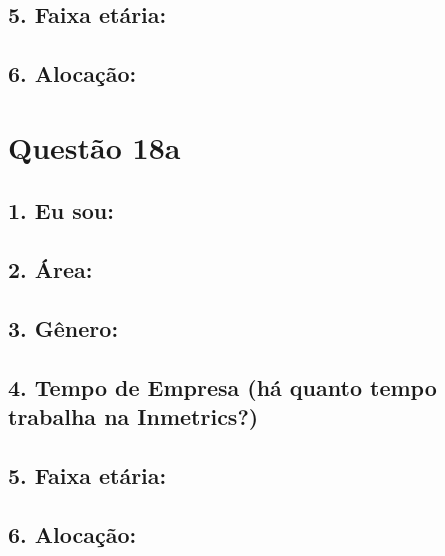 \documentclass[]{book}
\begin{document}
\hypertarget{faixa-etaria-39}{%
\subsection{5. Faixa etária:}\label{faixa-etaria-39}}

\hypertarget{alocacao-39}{%
\subsection{6. Alocação:}\label{alocacao-39}}

\hypertarget{questao-18a}{%
\section{Questão 18a}\label{questao-18a}}

\hypertarget{eu-sou-40}{%
\subsection{1. Eu sou:}\label{eu-sou-40}}

\hypertarget{area-40}{%
\subsection{2. Área:}\label{area-40}}

\hypertarget{genero-40}{%
\subsection{3. Gênero:}\label{genero-40}}

\hypertarget{tempo-de-empresa-ha-quanto-tempo-trabalha-na-inmetrics-40}{%
\subsection{4. Tempo de Empresa (há quanto tempo trabalha na Inmetrics?)}\label{tempo-de-empresa-ha-quanto-tempo-trabalha-na-inmetrics-40}}

\hypertarget{faixa-etaria-40}{%
\subsection{5. Faixa etária:}\label{faixa-etaria-40}}

\hypertarget{alocacao-40}{%
\subsection{6. Alocação:}\label{alocacao-40}}
\end{document}
